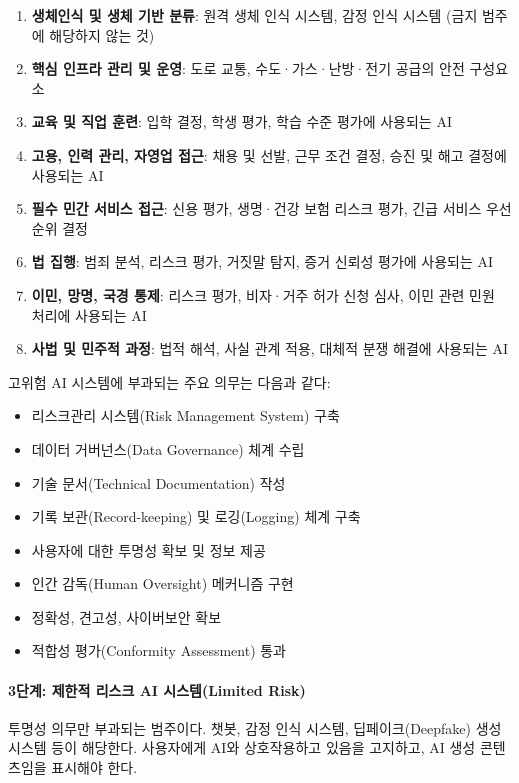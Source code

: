 \begin{enumerate}
 \item \textbf{생체인식 및 생체 기반 분류}: 원격 생체 인식 시스템, 감정 인식 시스템 (금지 범주에 해당하지 않는 것)
 \item \textbf{핵심 인프라 관리 및 운영}: 도로 교통, 수도·가스·난방·전기 공급의 안전 구성요소
 \item \textbf{교육 및 직업 훈련}: 입학 결정, 학생 평가, 학습 수준 평가에 사용되는 AI
 \item \textbf{고용, 인력 관리, 자영업 접근}: 채용 및 선발, 근무 조건 결정, 승진 및 해고 결정에 사용되는 AI
 \item \textbf{필수 민간 서비스 접근}: 신용 평가, 생명·건강 보험 리스크 평가, 긴급 서비스 우선순위 결정
 \item \textbf{법 집행}: 범죄 분석, 리스크 평가, 거짓말 탐지, 증거 신뢰성 평가에 사용되는 AI
 \item \textbf{이민, 망명, 국경 통제}: 리스크 평가, 비자·거주 허가 신청 심사, 이민 관련 민원 처리에 사용되는 AI
 \item \textbf{사법 및 민주적 과정}: 법적 해석, 사실 관계 적용, 대체적 분쟁 해결에 사용되는 AI
\end{enumerate}

고위험 AI 시스템에 부과되는 주요 의무는 다음과 같다:
\begin{itemize}
 \item 리스크관리 시스템(Risk Management System) 구축
 \item 데이터 거버넌스(Data Governance) 체계 수립
 \item 기술 문서(Technical Documentation) 작성
 \item 기록 보관(Record-keeping) 및 로깅(Logging) 체계 구축
 \item 사용자에 대한 투명성 확보 및 정보 제공
 \item 인간 감독(Human Oversight) 메커니즘 구현
 \item 정확성, 견고성, 사이버보안 확보
 \item 적합성 평가(Conformity Assessment) 통과\cite{mokander2022conformity}
\end{itemize}

\paragraph{3단계: 제한적 리스크 AI 시스템(Limited Risk)}
투명성 의무만 부과되는 범주이다. 챗봇, 감정 인식 시스템, 딥페이크(Deepfake) 생성 시스템 등이 해당한다. 사용자에게 AI와 상호작용하고 있음을 고지하고, AI 생성 콘텐츠임을 표시해야 한다.

